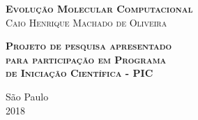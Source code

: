 \begin{center}
\textsc{\textbf{\LARGE Evolução Molecular Computacional }}
\\\vspace{2cm}
\textsc{\large Caio Henrique Machado de Oliveira }
\end{center}

\vspace{2cm}

\begin{flushright}
\textsc{\textbf{Projeto de pesquisa apresentado\\para participação em Programa\\de Iniciação Científica - PIC}}
\end{flushright}

\vfill
\begin{center}
São Paulo \\ 2018
\end{center}
